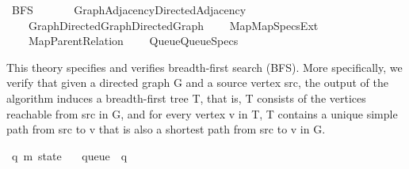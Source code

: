 %
\begin{isabellebody}%
%
%
\isadelimtheory
%
\endisadelimtheory
%
\isatagtheory
{}\isamarkupfalse%
\ BFS\isanewline
\ \ \isanewline
\ \ \ \ {\isachardoublequoteopen}{\isachardot}{\kern0pt}{\isachardot}{\kern0pt}{\isacharslash}{\kern0pt}Graph{\isacharslash}{\kern0pt}Adjacency{\isacharslash}{\kern0pt}Directed{\isacharunderscore}{\kern0pt}Adjacency{\isachardoublequoteclose}\isanewline
\ \ \ \ {\isachardoublequoteopen}{\isachardot}{\kern0pt}{\isachardot}{\kern0pt}{\isacharslash}{\kern0pt}Graph{\isacharslash}{\kern0pt}Directed{\isacharunderscore}{\kern0pt}Graph{\isacharslash}{\kern0pt}Directed{\isacharunderscore}{\kern0pt}Graph{\isachardoublequoteclose}\isanewline
\ \ \ \ {\isachardoublequoteopen}{\isachardot}{\kern0pt}{\isachardot}{\kern0pt}{\isacharslash}{\kern0pt}Map{\isacharslash}{\kern0pt}Map{\isacharunderscore}{\kern0pt}Specs{\isacharunderscore}{\kern0pt}Ext{\isachardoublequoteclose}\isanewline
\ \ \ \ {\isachardoublequoteopen}{\isachardot}{\kern0pt}{\isachardot}{\kern0pt}{\isacharslash}{\kern0pt}Map{\isacharslash}{\kern0pt}Parent{\isacharunderscore}{\kern0pt}Relation{\isachardoublequoteclose}\isanewline
\ \ \ \ {\isachardoublequoteopen}{\isachardot}{\kern0pt}{\isachardot}{\kern0pt}{\isacharslash}{\kern0pt}Queue{\isacharslash}{\kern0pt}Queue{\isacharunderscore}{\kern0pt}Specs{\isachardoublequoteclose}\isanewline
{}%
\endisatagtheory
{\isafoldtheory}%
%
\isadelimtheory
%
\endisadelimtheory
%
\begin{isamarkuptext}%
This theory specifies and verifies breadth-first search (BFS). More specifically, we verify that
given a directed graph G and a source vertex src, the output of the algorithm induces a
breadth-first tree T, that is, T consists of the vertices reachable from src in G, and for every
vertex v in T, T contains a unique simple path from src to v that is also a shortest path from src
to v in G.%
\end{isamarkuptext}\isamarkuptrue%
%
\isadelimdocument
%
\endisadelimdocument
%
\isatagdocument
%
\isamarkuptrue%
%
\isamarkuptrue%
%
\endisatagdocument
{\isafolddocument}%
%
\isadelimdocument
%
\endisadelimdocument
{}\isamarkupfalse%
\ {\isacharparenleft}{\kern0pt}{\isacharprime}{\kern0pt}q{\isacharcomma}{\kern0pt}\ {\isacharprime}{\kern0pt}m{\isacharparenright}{\kern0pt}\ state\ {\isacharequal}{\kern0pt}\isanewline
\ \ queue\ {\isacharcolon}{\kern0pt}{\isacharcolon}{\kern0pt}\ {\isacharprime}{\kern0pt}q\isanewline

\end{isabellebody}
